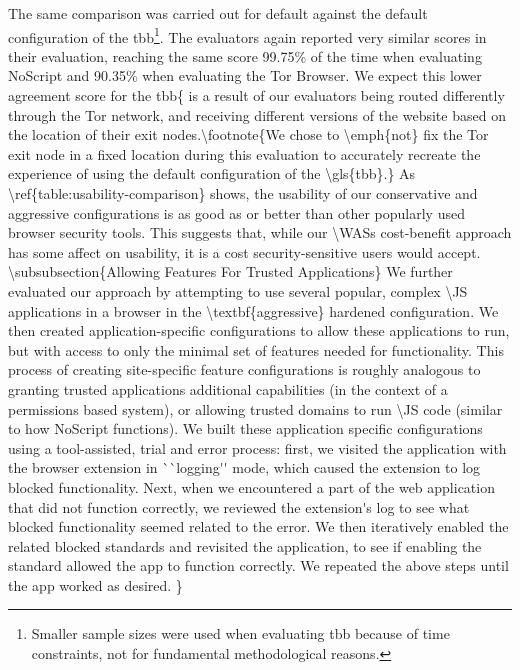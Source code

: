 The same comparison was carried out for default \FF against
the default configuration of the \gls{tbb}\footnote{Smaller sample sizes were used when evaluating \gls{tbb} because of time constraints,
not for fundamental methodological reasons.}.  The evaluators again
reported very similar scores in their evaluation, reaching the same score
99.75\% of the time when evaluating NoScript and 90.35\% when evaluating the
Tor Browser.  We expect this lower agreement score for the \gls{tbb{ is
a result of our evaluators being routed differently through the Tor network, and
receiving different versions of the website based on the location of their
exit nodes.\footnote{We chose to \emph{not} fix the Tor exit node in a fixed
location during this evaluation to accurately recreate the experience of using
the default configuration of the \gls{tbb}.}

As \ref{table:usability-comparison} shows, the usability of our conservative
and aggressive configurations is as good as or better than other popularly used
browser security tools.  This suggests that, while our \WASs cost-benefit
approach has some affect on usability, it is a cost security-sensitive users
would accept.


\subsubsection{Allowing Features For Trusted Applications}
We further evaluated our approach by attempting to use several popular,
complex \JS applications in a browser in the \textbf{aggressive} hardened
configuration.  We then created application-specific configurations to allow
these applications to run, but with access to only the minimal set of
features needed for functionality.

This process of creating site-specific feature configurations
is roughly analogous to granting trusted applications additional
capabilities (in the context of a permissions based system), or allowing trusted
domains to run \JS code (similar to how NoScript functions).

We built these application specific configurations using a tool-assisted, trial
and error process: first, we visited the application with the browser extension
in ``logging'' mode, which caused the extension to log blocked functionality.
Next, when we encountered a part of the web application that did not function
correctly, we reviewed the extension's log to see what blocked functionality
seemed related to the error.  We then iteratively enabled the related blocked
standards and revisited the application, to see if enabling the standard
allowed the app to function correctly.  We repeated the above steps until the
app worked as desired.

}}
